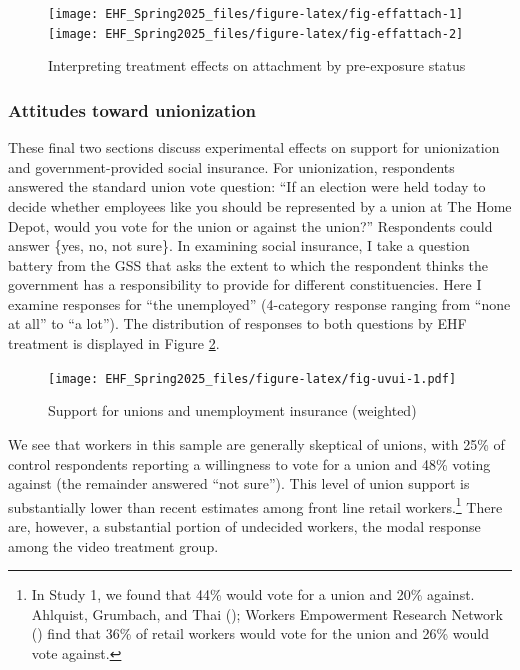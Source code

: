 \documentclass[
  11pt,
  oneside]{article}
\begin{document}
\begin{figure}
\texttt{[image: EHF\_Spring2025\_files/figure-latex/fig-effattach-1]} \texttt{[image: EHF\_Spring2025\_files/figure-latex/fig-effattach-2]} \caption{Interpreting treatment effects on attachment by pre-exposure status}\label{fig:fig-effattach}
\end{figure}

\subsubsection{Attitudes toward unionization}\label{attitudes-toward-unionization}

These final two sections discuss experimental effects on support for unionization and government-provided social insurance. For unionization, respondents answered the standard union vote question: ``If an election were held today to decide whether employees like you should be represented by a union at The Home Depot, would you vote for the union or against the union?'' Respondents could answer \{yes, no, not sure\}. In examining social insurance, I take a question battery from the GSS that asks the extent to which the respondent thinks the government has a responsibility to provide for different constituencies. Here I examine responses for ``the unemployed'' (4-category response ranging from ``none at all'' to ``a lot''). The distribution of responses to both questions by EHF treatment is displayed in Figure \ref{fig:fig-uvui}.

\begin{figure}
\centering
\texttt{[image: EHF\_Spring2025\_files/figure-latex/fig-uvui-1.pdf]}
\caption{\label{fig:fig-uvui}Support for unions and unemployment insurance (weighted)}
\end{figure}

We see that workers in this sample are generally skeptical of unions, with 25\% of control respondents reporting a willingness to vote for a union and 48\% voting against (the remainder answered ``not sure''). This level of union support is substantially lower than recent estimates among front line retail workers.\footnote{In Study 1, we found that 44\% would vote for a union and 20\% against. Ahlquist, Grumbach, and Thai (); Workers Empowerment Research Network () find that 36\% of retail workers would vote for the union and 26\% would vote against.} There are, however, a substantial portion of undecided workers, the modal response among the video treatment group.
\end{document}
